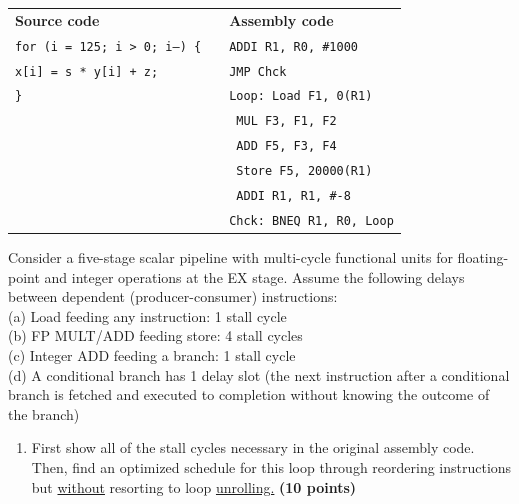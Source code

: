 \documentclass[a4paper, 11pt]{exam}
\begin{document}
\begin{center}
\begin{enumerate}
\begin{tabular}{lll}
	\textbf{Source code} & & \textbf{Assembly code }\\
	\texttt{for (i = 125; i > 0; i--) \{}&  &\hspace{40pt}\texttt{ADDI R1, R0, \#1000} \\
	\hspace{20pt}\texttt{x[i] = s * y[i] + z;} &  &\hspace{40pt}\texttt{JMP Chck}\\
	\texttt{\}} &  &\texttt{Loop: Load F1, 0(R1)} \\
    &  &\hspace{35pt}\texttt{ MUL F3, F1, F2}\\
	&  &\hspace{35pt}\texttt{ ADD F5, F3, F4}\\
	&  &\hspace{35pt}\texttt{ Store F5, 20000(R1)}\\
	&  &\hspace{35pt}\texttt{ ADDI R1, R1, \#-8}\\
	&  &\texttt{Chck: BNEQ R1, R0, Loop}\\
\end{tabular}

Consider a five-stage scalar pipeline with multi-cycle functional units for floating-point and integer operations at the EX stage.
Assume the following delays between dependent (producer-consumer) instructions:\\
(a) Load feeding any instruction: 1 stall cycle\\
(b) FP MULT/ADD feeding store: 4 stall cycles\\
(c) Integer ADD feeding a branch: 1 stall cycle\\
(d) A conditional branch has 1 delay slot (the next instruction after a conditional branch is fetched and executed to completion without knowing the outcome of the branch)

\begin{enumerate}
	\item First show all of the stall cycles necessary in the original assembly code. Then, find an optimized schedule for this loop through reordering instructions but \underline{without} resorting to loop \underline{unrolling.} \textbf{(10 points)}
	

\end{enumerate}
\end{enumerate}
\end{center}
\end{document}
